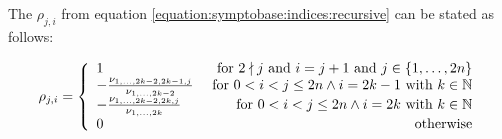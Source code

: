 \documentclass[../SymplecticSimplices.tex]{subfiles}
\begin{document}
\begin{lemma}
  \label{lemma:rhoasquotients}
  The \( \rho_{j, i} \) from equation \eqref{equation:symptobase:indices:recursive} can be stated as follows:

\begin{equation}
  \label{equation:symptobase:indices:pretty}
  \rho_{j,i} = \left\lbrace
\begin{array}{lr}
  1 & \textnormal{ for } 2 \nmid j \textnormal{ and } i = j + 1  \textnormal{ and } j \in \left\lbrace 1, \dots, 2n \right\rbrace \\
  -\frac{\nu_{1,\dots,2k-2,2k-1,j}}{\nu_{1,\dots,2k-2}} & \textnormal{ for } 0 < i < j \leq 2n \land i = 2k - 1 \textnormal{ with } k \in \mathbb{N} \\
  -\frac{\nu_{1,\dots,2k-2,2k,j}}{\nu_{1,\dots,2k}} & \textnormal{ for } 0 < i < j \leq 2n \land i = 2k \textnormal{ with } k \in \mathbb{N} \\
  0 & \textnormal{ otherwise} \\
\end{array} \right.
\end{equation}
\end{lemma}
\end{document}

